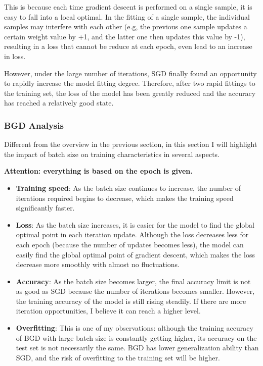 \documentclass{article}
\begin{document}
This is because each time gradient descent is performed on a single sample, it is easy to fall into a local optimal. In the fitting of a single sample, the individual samples may interfere with each other (e.g, the previous one sample updates a certain weight value by +1, and the latter one then updates this value by -1), resulting in a loss that cannot be reduce at each epoch, even lead to an increase in loss.

However, under the large number of iterations, SGD finally found an opportunity to rapidly increase the model fitting degree. Therefore, after two rapid fittings to the training set, the loss of the model has been greatly reduced and the accuracy has reached a relatively good state.

\subsubsection{BGD Analysis}

Different from the overview in the previous section, in this section I will highlight the impact of batch size on training characteristics in several aspects.

\textbf{Attention: everything is based on the epoch is given.}

\begin{itemize}
    \item \textbf{Training speed}: As the batch size continues to increase, the number of iterations required begins to decrease, which makes the training speed significantly faster.
    \item \textbf{Loss}: As the batch size increases, it is easier for the model to find the global optimal point in each iteration update. Although the loss decreases less for each epoch (because the number of updates becomes less), the model can easily find the global optimal point of gradient descent, which makes the loss decrease more smoothly with almost no fluctuations.
    \item \textbf{Accuracy}: As the batch size becomes larger, the final accuracy limit is not as good as SGD because the number of iterations becomes smaller. However, the training accuracy of the model is still rising steadily. If there are more iteration opportunities, I believe it can reach a higher level.
    \item \textbf{Overfitting}: This is one of my observations: although the training accuracy of BGD with large batch size is constantly getting higher, its accuracy on the test set is not necessarily the same. BGD has lower generalization ability than SGD, and the risk of overfitting to the training set will be higher.
\end{itemize}
\end{document}

